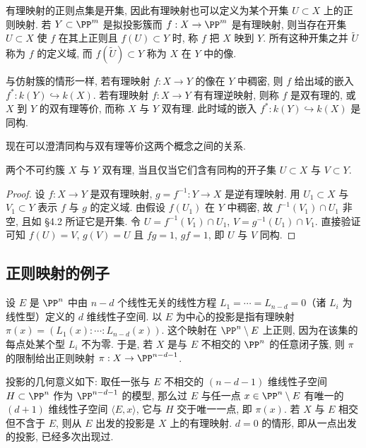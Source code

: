 有理映射的正则点集是开集, 因此有理映射也可以定义为某个开集 $U \subset X$ 上的正则映射. 若 $Y \subset \PP^m$ 是拟投影簇而 $f: X \to \PP^m$ 是有理映射, 则当存在开集 $U \subset X$ 使 $f$ 在其上正则且 $f(U) \subset Y$ 时, 称 $f$ 把 $X$ 映到 $Y$. 所有这种开集之并 $\widetilde U$ 称为 $f$ 的定义域, 而 $f(\widetilde U) \subset Y$ 称为 $X$ 在 $Y$ 中的像.

与仿射簇的情形一样, 若有理映射 $f: X \to Y$ 的像在 $Y$ 中稠密, 则 $f$ 给出域的嵌入 $f^*: k(Y) \hookrightarrow k(X)$. 若有理映射 $f: X \to Y$ 有有理逆映射, 则称 $f$ 是双有理的, 或 $X$ 到 $Y$ 的双有理等价, 而称 $X$ 与 $Y$ 双有理. 此时域的嵌入 $f^*: k(Y) \hookrightarrow k(X)$ 是同构.

现在可以澄清同构与双有理等价这两个概念之间的关系.

\begin{proposition}\label{prop:birational-opens}
	两个不可约簇 $X$ 与 $Y$ 双有理, 当且仅当它们含有同构的开子集 $U \subset X$ 与 $V \subset Y$.
\end{proposition}

\begin{proof}
	设 $f: X \to Y$ 是双有理映射, $g = f^{-1}: Y \to X$ 是逆有理映射. 用 $U_1 \subset X$ 与 $V_1 \subset Y$ 表示 $f$ 与 $g$ 的定义域. 由假设 $f(U_1)$ 在 $Y$ 中稠密, 故 $f^{-1}(V_1) \cap U_1$ 非空, 且如 §4.2 所证它是开集. 令 $U = f^{-1}(V_1) \cap U_1$, $V = g^{-1}(U_1) \cap V_1$. 直接验证可知 $f(U) = V$, $g(V) = U$ 且 $fg = 1$, $gf = 1$, 即 $U$ 与 $V$ 同构.
\end{proof}

\subsection{正则映射的例子}

\begin{example}[投影]\label{exam:projection}
	设 $E$ 是 $\PP^n$ 中由 $n - d$ 个线性无关的线性方程 $L_1 = \cdots = L_{n-d} = 0$（诸 $L_i$ 为线性型）定义的 $d$ 维线性子空间. 以 $E$ 为中心的投影是指有理映射 $\pi(x) = (L_1(x) : \cdots : L_{n-d}(x))$. 这个映射在 $\PP^n \setminus E$ 上正则, 因为在该集的每点处某个型 $L_i$ 不为零. 于是, 若 $X$ 是与 $E$ 不相交的 $\PP^n$ 的任意闭子簇, 则 $\pi$ 的限制给出正则映射 $\pi: X \to \PP^{n-d-1}$.

	投影的几何意义如下: 取任一张与 $E$ 不相交的 $(n-d-1)$ 维线性子空间 $H \subset \PP^n$ 作为 $\PP^{n-d-1}$ 的模型, 那么过 $E$ 与任一点 $x \in \PP^n \setminus E$ 有唯一的 $(d+1)$ 维线性子空间 $\langle E, x \rangle$, 它与 $H$ 交于唯一一点, 即 $\pi(x)$. 若 $X$ 与 $E$ 相交但不含于 $E$, 则从 $E$ 出发的投影是 $X$ 上的有理映射. $d = 0$ 的情形, 即从一点出发的投影, 已经多次出现过.
\end{example}


